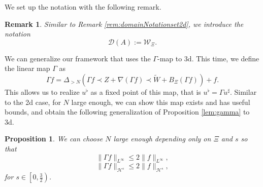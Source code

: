 \documentclass[11pt, oneside]{article}   	%
\newtheorem{proposition}[theorem]{Proposition}
\newtheorem{remark}[theorem]{Remark}
\newcommand{\ssp}{\mathscr{H}}
\begin{document}
We set up the notation with the following remark.

\begin{remark}\upshape\label{rem:domainNotationset3d}
	Similar to Remark \ref{rem:domainNotationset2d}, we introduce the notation \[\mathscr{D}(A) := \mathscr{W}_{\Xi}.\]
\end{remark}

We can generalize our framework that uses the $\Gamma$-map to 3d. This time, we  define
the linear map  $\Gamma$ as
\begin{equation}\label{equ:ubetaCUTTansatz}
\Gamma f = \Delta_{> N} (\Gamma f \prec Z + \nabla (\Gamma f) \prec
\tilde{W} + B_{\Xi} (\Gamma f)) + f. 
\end{equation}
This  allows us to realize $u^\flat$ as a fixed point of this map, that is $u^\flat = \Gamma u^{\sharp}$. Similar to the 2d case, for $N$ large enough,  we
can show this map exists and has useful bounds, and obtain the following generalization of Proposition \ref{lem:gamma} to 3d.

\begin{proposition}
	\label{lem:gamma3}We can choose $N$ large enough depending only on $\Xi$ and
	$s$ so that
	\begin{equation}
	\| \Gamma f \|_{L^{\infty}} \le 2 \| f \|_{L^{\infty}},
	\label{eq:gamma3-bound-Linfty}
	\end{equation}
	\begin{equation}
	\| \Gamma f \|_{\ssp^s} \le 2 \| f \|_{\ssp^s},
	\label{eq:gamma3-bound-sobolev}
	\end{equation}
	for $s \in \left[ 0, \frac{3}{2} \right)$.
\end{proposition}
\end{document}
